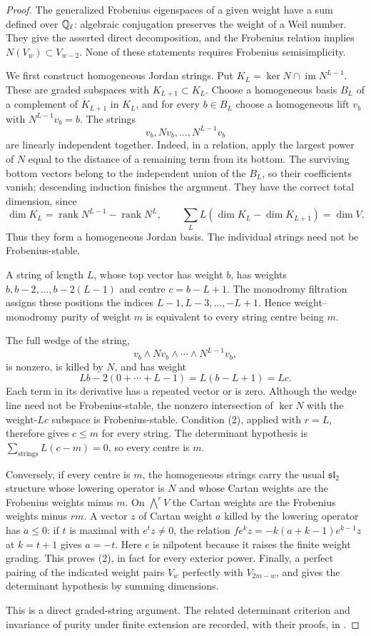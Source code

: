 \begin{proof}
The generalized Frobenius eigenspaces of a given weight have a
sum defined over $\mathbb Q_\ell$: algebraic conjugation preserves the
weight of a Weil number.  They give the asserted direct
decomposition, and the Frobenius relation implies
$N(V_w)\subset V_{w-2}$.  None of these statements requires
Frobenius semisimplicity.

We first construct homogeneous Jordan strings.  Put
$K_L=\ker N\cap\operatorname{im}N^{L-1}$.  These are graded
subspaces with $K_{L+1}\subset K_L$.  Choose a homogeneous basis
$B_L$ of a complement of $K_{L+1}$ in $K_L$, and for every
$b\in B_L$ choose a homogeneous lift $v_b$ with
$N^{L-1}v_b=b$.  The strings
\[
 v_b,Nv_b,\ldots,N^{L-1}v_b
\]
are linearly independent together.  Indeed, in a relation,
apply the largest power of $N$ equal to the distance of a
remaining term from its bottom.  The surviving bottom vectors
belong to the independent union of the $B_L$, so their
coefficients vanish; descending induction finishes the argument.
They have the correct total dimension, since
\[
 \dim K_L=\operatorname{rank}N^{L-1}
               -\operatorname{rank}N^L,\qquad
 \sum_L L(\dim K_L-\dim K_{L+1})=\dim V.
\]
Thus they form a homogeneous Jordan basis.  The individual
strings need not be Frobenius-stable.

A string of length $L$, whose top vector has weight $b$, has
weights $b,b-2,\ldots,b-2(L-1)$ and centre $c=b-L+1$.
The monodromy filtration assigns these positions the indices
$L-1,L-3,\ldots,-L+1$.  Hence weight--monodromy purity of
weight $m$ is equivalent to every string centre being $m$.

The full wedge of the string,
\[
 v_b\wedge Nv_b\wedge\cdots\wedge N^{L-1}v_b,
\]
is nonzero, is killed by $N$, and has weight
\[
 Lb-2(0+\cdots+L-1)=L(b-L+1)=Lc.
\]
Each term in its derivative has a repeated vector or is zero.
Although the wedge line need not be Frobenius-stable, the
nonzero intersection of $\ker N$ with the weight-$Lc$ subspace
is Frobenius-stable.  Condition (2), applied with $r=L$, therefore
gives $c\leq m$ for every string.  The determinant hypothesis is
$\sum_{\text{strings}}L(c-m)=0$, so every centre is $m$.

Conversely, if every centre is $m$, the homogeneous strings
carry the usual $\mathfrak{sl}_2$ structure whose lowering
operator is $N$ and whose Cartan weights are the Frobenius
weights minus $m$.  On $\bigwedge^rV$ the Cartan weights are
the Frobenius weights minus $rm$.  A vector $z$ of Cartan
weight $a$ killed by the lowering operator has $a\leq0$:
if $t$ is maximal with $e^tz\ne0$, the relation
$f e^kz=-k(a+k-1)e^{k-1}z$ at $k=t+1$ gives
$a=-t$.  Here $e$ is nilpotent because it raises the finite
weight grading.  This proves (2), in fact for every exterior power.
Finally, a perfect pairing of the indicated weight pairs
$V_w$ perfectly with $V_{2m-w}$, and gives the determinant
hypothesis by summing dimensions.

This is a direct graded-string argument.  The related
determinant criterion and invariance of purity under finite
extension are recorded, with their proofs, in
\citet[Lemma~1.4(1), (2), (5), author pp.~6--7]{c_tayloryoshida2007}.
\end{proof}

